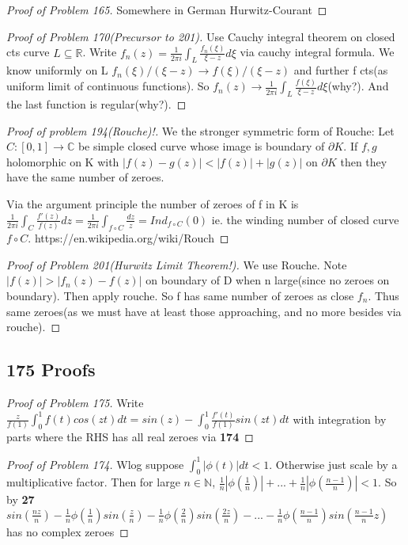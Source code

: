 \documentclass[10pt]{article}
\newcommand{\1}{\textbf{1}}
\newcommand{\R}{\mathbb{R}}
\newcommand{\C}{\mathbb{C}}
\newcommand{\N}{\mathbb{N}}
\theoremstyle{remark}
\theoremstyle{definition}
\begin{document}
\begin{proof}[Proof of Problem 165]
	Somewhere in German Hurwitz-Courant
\end{proof}

\begin{proof}[Proof of Problem 170(Precursor to 201)]
	Use Cauchy integral theorem on closed cts curve $L \subseteq \R$. Write $f_n(z) = \frac{1}{2 \pi i }\int_L \frac{f_n(\xi)}{\xi-z}d\xi$ via cauchy integral formula. We know uniformly on L $f_n(\xi)/(\xi - z) \to f(\xi)/(\xi -z)$ and further f cts(as uniform limit of continuous functions). So $f_n(z) \to \frac{1}{2 \pi i} \int_L \frac{f(\xi)}{\xi -z}d \xi$(why?). And the last function is regular(why?).
\end{proof}

\begin{proof}[Proof of problem 194(Rouche)!]
	We the stronger symmetric form of Rouche: Let $C: [0,1] \to \C$ be simple closed curve whose image is boundary of $\partial K$. If $f,g$ holomorphic on K with $|f(z) - g(z)| < |f(z)|+|g(z)|$ on $\partial K$ then they have the same number of zeroes. 

	Via the argument principle the number of zeroes of f in K is $\frac{1}{2 \pi i} \int_C \frac{f'(z)}{f(z)}dz = \frac{1}{2\pi i}\int_{f \circ C} \frac{dz}{z} = Ind_{f\circ C}(0)$ ie. the winding number of closed curve $f \circ C$. https://en.wikipedia.org/wiki/Rouch%
\end{proof}

\begin{proof}[Proof of Problem 201(Hurwitz Limit Theorem!)]
	We use Rouche. Note $|f(z)| > |f_n(z) - f(z)|$ on boundary of D when n large(since no zeroes on boundary). Then apply rouche. So f has same number of zeroes as close $f_n$. Thus same zeroes(as we must have at least those approaching, and no more besides via rouche).
\end{proof}

\subsection{175 Proofs}

\begin{proof}[Proof of Problem 175]
	Write $\frac{z}{f(1)} \int_0^1 f(t)cos(zt)dt = sin(z) - \int_0^1 \frac{f'(t)}{f(1)}sin(zt) dt$ with integration by parts where the RHS has all real zeroes via \textbf{174}
\end{proof}

\begin{proof}[Proof of Problem 174]
	Wlog suppose $\int_0^1 |\phi(t)| dt < 1$. Otherwise just scale by a multiplicative factor. Then for large $n \in \N$, $\frac{1}{n}|\phi(\frac{1}{n})| + ... + \frac{1}{n} |\phi(\frac{n-1}{n})| < 1$. So by \textbf{27} $sin(\frac{nz}{n}) - \frac{1}{n}\phi(\frac{1}{n}) sin(\frac{z}{n}) - \frac{1}{n}\phi(\frac{2}{n})sin(\frac{2 z}{n}) - ... - \frac{1}{n}\phi(\frac{n-1}{n})sin(\frac{n-1}{n}z)$ has no complex zeroes
\end{proof}
\end{document}
